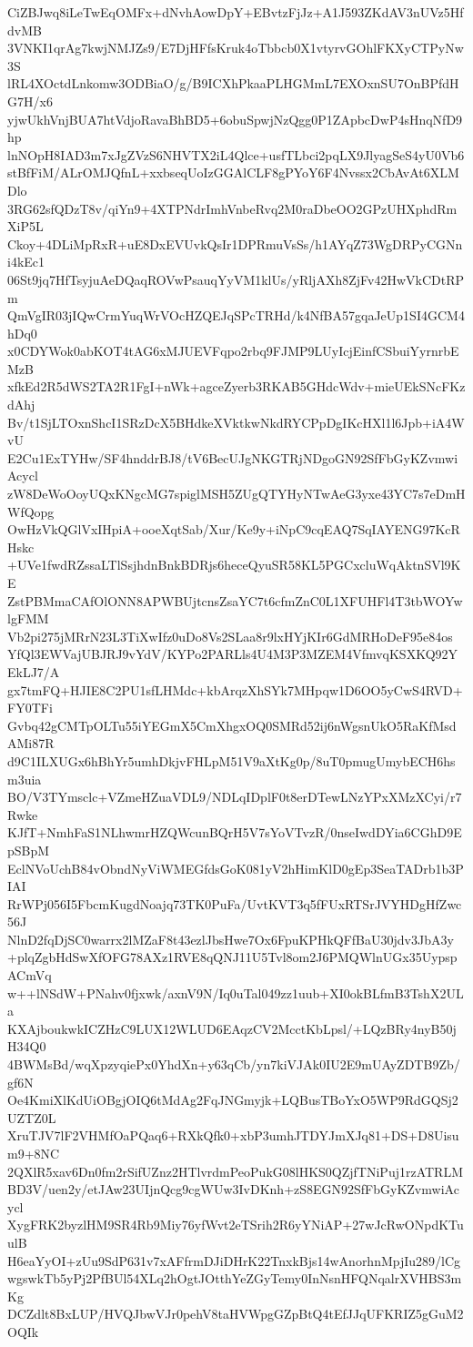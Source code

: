 CiZBJwq8iLeTwEqOMFx+dNvhAowDpY+EBvtzFjJz+A1J593ZKdAV3nUVz5HfdvMB
3VNKI1qrAg7kwjNMJZs9/E7DjHFfsKruk4oTbbcb0X1vtyrvGOhlFKXyCTPyNw3S
lRL4XOctdLnkomw3ODBiaO/g/B9ICXhPkaaPLHGMmL7EXOxnSU7OnBPfdHG7H/x6
yjwUkhVnjBUA7htVdjoRavaBhBD5+6obuSpwjNzQgg0P1ZApbcDwP4sHnqNfD9hp
lnNOpH8IAD3m7xJgZVzS6NHVTX2iL4Qlce+usfTLbci2pqLX9JlyagSeS4yU0Vb6
stBfFiM/ALrOMJQfnL+xxbseqUoIzGGAlCLF8gPYoY6F4Nvssx2CbAvAt6XLMDlo
3RG62sfQDzT8v/qiYn9+4XTPNdrImhVnbeRvq2M0raDbeOO2GPzUHXphdRmXiP5L
Ckoy+4DLiMpRxR+uE8DxEVUvkQsIr1DPRmuVsSs/h1AYqZ73WgDRPyCGNni4kEc1
06St9jq7HfTsyjuAeDQaqROVwPsauqYyVM1klUs/yRljAXh8ZjFv42HwVkCDtRPm
QmVgIR03jIQwCrmYuqWrVOcHZQEJqSPcTRHd/k4NfBA57gqaJeUp1SI4GCM4hDq0
x0CDYWok0abKOT4tAG6xMJUEVFqpo2rbq9FJMP9LUyIcjEinfCSbuiYyrnrbEMzB
xfkEd2R5dWS2TA2R1FgI+nWk+agceZyerb3RKAB5GHdcWdv+mieUEkSNcFKzdAhj
Bv/t1SjLTOxnShcI1SRzDcX5BHdkeXVktkwNkdRYCPpDgIKcHXl1l6Jpb+iA4WvU
E2Cu1ExTYHw/SF4hnddrBJ8/tV6BecUJgNKGTRjNDgoGN92SfFbGyKZvmwiAcycl
zW8DeWoOoyUQxKNgcMG7spiglMSH5ZUgQTYHyNTwAeG3yxe43YC7s7eDmHWfQopg
OwHzVkQGlVxIHpiA+ooeXqtSab/Xur/Ke9y+iNpC9cqEAQ7SqIAYENG97KcRHskc
+UVe1fwdRZssaLTlSsjhdnBnkBDRjs6heceQyuSR58KL5PGCxcluWqAktnSVl9KE
ZstPBMmaCAfOlONN8APWBUjtcnsZsaYC7t6cfmZnC0L1XFUHFl4T3tbWOYwlgFMM
Vb2pi275jMRrN23L3TiXwIfz0uDo8Vs2SLaa8r9lxHYjKIr6GdMRHoDeF95e84os
YfQl3EWVajUBJRJ9vYdV/KYPo2PARLls4U4M3P3MZEM4VfmvqKSXKQ92YEkLJ7/A
gx7tmFQ+HJIE8C2PU1sfLHMdc+kbArqzXhSYk7MHpqw1D6OO5yCwS4RVD+FY0TFi
Gvbq42gCMTpOLTu55iYEGmX5CmXhgxOQ0SMRd52ij6nWgsnUkO5RaKfMsdAMi87R
d9C1ILXUGx6hBhYr5umhDkjvFHLpM51V9aXtKg0p/8uT0pmugUmybECH6hsm3uia
BO/V3TYmsclc+VZmeHZuaVDL9/NDLqIDplF0t8erDTewLNzYPxXMzXCyi/r7Rwke
KJfT+NmhFaS1NLhwmrHZQWcunBQrH5V7sYoVTvzR/0nseIwdDYia6CGhD9EpSBpM
EclNVoUchB84vObndNyViWMEGfdsGoK081yV2hHimKlD0gEp3SeaTADrb1b3PIAI
RrWPj056I5FbcmKugdNoajq73TK0PuFa/UvtKVT3q5fFUxRTSrJVYHDgHfZwc56J
NlnD2fqDjSC0warrx2lMZaF8t43ezlJbsHwe7Ox6FpuKPHkQFfBaU30jdv3JbA3y
+plqZgbHdSwXfOFG78AXz1RVE8qQNJ11U5Tvl8om2J6PMQWlnUGx35UypspACmVq
w++lNSdW+PNahv0fjxwk/axnV9N/Iq0uTal049zz1uub+XI0okBLfmB3TshX2ULa
KXAjboukwkICZHzC9LUX12WLUD6EAqzCV2McctKbLpsl/+LQzBRy4nyB50jH34Q0
4BWMsBd/wqXpzyqiePx0YhdXn+y63qCb/yn7kiVJAk0IU2E9mUAyZDTB9Zb/gf6N
Oe4KmiXlKdUiOBgjOIQ6tMdAg2FqJNGmyjk+LQBusTBoYxO5WP9RdGQSj2UZTZ0L
XruTJV7lF2VHMfOaPQaq6+RXkQfk0+xbP3umhJTDYJmXJq81+DS+D8Uisum9+8NC
2QXlR5xav6Dn0fm2rSifUZnz2HTlvrdmPeoPukG08lHKS0QZjfTNiPuj1rzATRLM
BD3V/uen2y/etJAw23UIjnQcg9cgWUw3IvDKnh+zS8EGN92SfFbGyKZvmwiAcycl
XygFRK2byzlHM9SR4Rb9Miy76yfWvt2eTSrih2R6yYNiAP+27wJcRwONpdKTuulB
H6eaYyOI+zUu9SdP631v7xAFfrmDJiDHrK22TnxkBjs14wAnorhnMpjIu289/lCg
wgswkTb5yPj2PfBUl54XLq2hOgtJOtthYeZGyTemy0InNsnHFQNqalrXVHBS3mKg
DCZdlt8BxLUP/HVQJbwVJr0pehV8taHVWpgGZpBtQ4tEfJJqUFKRIZ5gGuM2OQIk
